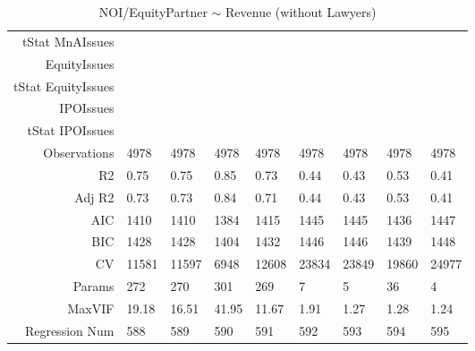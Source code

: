 \begin{table}[ht]
\begin{tabular}{rllllllll}
  tStat MnAIssues &  &  &  &  &  &  &  &  \\ 
  EquityIssues &  &  &  &  &  &  &  &  \\ 
  tStat EquityIssues &  &  &  &  &  &  &  &  \\ 
  IPOIssues &  &  &  &  &  &  &  &  \\ 
  tStat IPOIssues &  &  &  &  &  &  &  &  \\ 
  Observations & 4978 & 4978 & 4978 & 4978 & 4978 & 4978 & 4978 & 4978 \\ 
  R2 & 0.75 & 0.75 & 0.85 & 0.73 & 0.44 & 0.43 & 0.53 & 0.41 \\ 
  Adj R2 & 0.73 & 0.73 & 0.84 & 0.71 & 0.44 & 0.43 & 0.53 & 0.41 \\ 
  AIC & 1410 & 1410 & 1384 & 1415 & 1445 & 1445 & 1436 & 1447 \\ 
  BIC & 1428 & 1428 & 1404 & 1432 & 1446 & 1446 & 1439 & 1448 \\ 
  CV & 11581 & 11597 & 6948 & 12608 & 23834 & 23849 & 19860 & 24977 \\ 
  Params & 272 & 270 & 301 & 269 & 7 & 5 & 36 & 4 \\ 
  MaxVIF & 19.18 & 16.51 & 41.95 & 11.67 & 1.91 & 1.27 & 1.28 & 1.24 \\ 
  Regression Num & 588 & 589 & 590 & 591 & 592 & 593 & 594 & 595 \\ 
   \hline
\end{tabular}
\caption{NOI/EquityPartner $\sim$ Revenue (without Lawyers)} 
\end{table}
